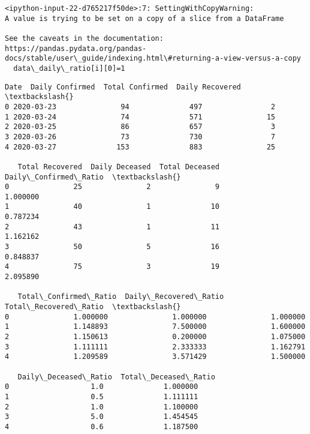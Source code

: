 \documentclass[11pt]{article}
\makeatletter
\newcommand{\boxspacing}{\kern\kvtcb@left@rule\kern\kvtcb@boxsep}
\newcommand{\prompt}[4]{
        \ttfamily\llap{{\color{#2}[#3]:\hspace{3pt}#4}}\vspace{-\baselineskip}
    }
\makeatother
\begin{document}
    \begin{Verbatim}[commandchars=\\\{\}]
<ipython-input-22-d765217f50de>:7: SettingWithCopyWarning:
A value is trying to be set on a copy of a slice from a DataFrame

See the caveats in the documentation: https://pandas.pydata.org/pandas-
docs/stable/user\_guide/indexing.html\#returning-a-view-versus-a-copy
  data\_daily\_ratio[i][0]=1
    \end{Verbatim}

            \begin{tcolorbox}[breakable, size=fbox, boxrule=.5pt, pad at break*=1mm, opacityfill=0]
\prompt{Out}{outcolor}{22}{\boxspacing}
\begin{Verbatim}[commandchars=\\\{\}]
        Date  Daily Confirmed  Total Confirmed  Daily Recovered  \textbackslash{}
0 2020-03-23               94              497                2
1 2020-03-24               74              571               15
2 2020-03-25               86              657                3
3 2020-03-26               73              730                7
4 2020-03-27              153              883               25

   Total Recovered  Daily Deceased  Total Deceased  Daily\_Confirmed\_Ratio  \textbackslash{}
0               25               2               9               1.000000
1               40               1              10               0.787234
2               43               1              11               1.162162
3               50               5              16               0.848837
4               75               3              19               2.095890

   Total\_Confirmed\_Ratio  Daily\_Recovered\_Ratio  Total\_Recovered\_Ratio  \textbackslash{}
0               1.000000               1.000000               1.000000
1               1.148893               7.500000               1.600000
2               1.150613               0.200000               1.075000
3               1.111111               2.333333               1.162791
4               1.209589               3.571429               1.500000

   Daily\_Deceased\_Ratio  Total\_Deceased\_Ratio
0                   1.0              1.000000
1                   0.5              1.111111
2                   1.0              1.100000
3                   5.0              1.454545
4                   0.6              1.187500
\end{Verbatim}
\end{tcolorbox}
        
\end{document}
